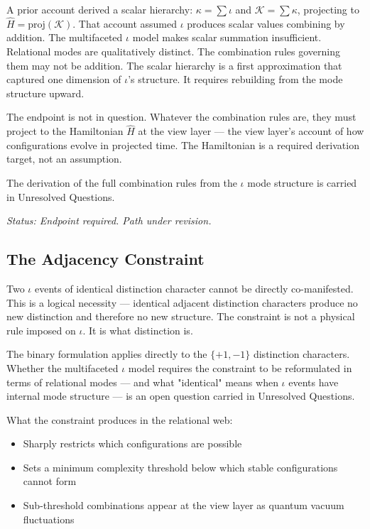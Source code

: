 \documentclass[11pt,letterpaper]{article}
\newcommand{\Kappa}{\mathcal{K}}
\begin{document}
A prior account derived a scalar hierarchy: \(\kappa = \sum \iota\) and \(\Kappa = \sum \kappa\), projecting to \(\hat{H} = \mathrm{proj}(\Kappa)\). That account assumed \(\iota\) produces scalar values combining by addition. The multifaceted \(\iota\) model makes scalar summation insufficient. Relational modes are qualitatively distinct. The combination rules governing them may not be addition. The scalar hierarchy is a first approximation that captured one dimension of \(\iota\)'s structure. It requires rebuilding from the mode structure upward.

The endpoint is not in question. Whatever the combination rules are, they must project to the Hamiltonian \(\hat{H}\) at the view layer --- the view layer's account of how configurations evolve in projected time. The Hamiltonian is a required derivation target, not an assumption.

The derivation of the full combination rules from the \(\iota\) mode structure is carried in Unresolved Questions.

\emph{Status: Endpoint required. Path under revision.}

\subsection{The Adjacency Constraint}
\label{sec:org2f8aedb}

Two \(\iota\) events of identical distinction character cannot be directly co-manifested. This is a logical necessity --- identical adjacent distinction characters produce no new distinction and therefore no new structure. The constraint is not a physical rule imposed on \(\iota\). It is what distinction is.

The binary formulation applies directly to the \(\{+1,-1\}\) distinction characters. Whether the multifaceted \(\iota\) model requires the constraint to be reformulated in terms of relational modes --- and what "identical" means when \(\iota\) events have internal mode structure --- is an open question carried in Unresolved Questions.

What the constraint produces in the relational web:
\begin{itemize}
\item Sharply restricts which configurations are possible
\item Sets a minimum complexity threshold below which stable configurations cannot form
\item Sub-threshold combinations appear at the view layer as quantum vacuum fluctuations
\end{itemize}
\end{document}
